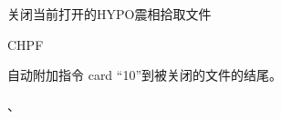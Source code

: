 \label{cmd:chpf}

关闭当前打开的HYPO震相拾取文件

\begin{SACSTX}
CHPF
\end{SACSTX}

自动附加指令 card ``10''到被关闭的文件的结尾。

、
